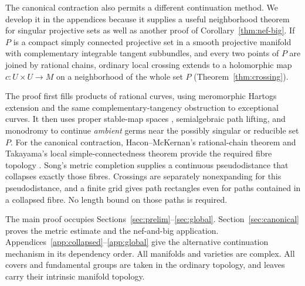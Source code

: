 The canonical contraction also permits a different continuation method.
We develop it in the appendices because it supplies a useful
neighborhood theorem for singular projective sets as well as another
proof of Corollary~\ref{thm:nef-big}. If $P$ is a compact simply connected
projective set in a smooth projective manifold with complementary integrable tangent
subbundles, and every two points of $P$ are joined by rational chains,
ordinary local crossing extends to a holomorphic map $c:U\times U\to M$
on a neighborhood of the whole set $P$
(Theorem~\ref{thm:crossing}).

The proof first fills products of rational curves, using meromorphic
Hartogs extension and the same complementary-tangency obstruction to
exceptional curves. It then uses proper stable-map spaces
\cite{FP97}, semialgebraic path lifting, and monodromy to continue
\emph{ambient} germs near the possibly singular or reducible set $P$.
For the canonical contraction, Hacon--McKernan's rational-chain theorem
and Takayama's local simple-connectedness theorem provide the required
fibre topology \cite{HM07,Takayama03}. Song's metric completion supplies
a continuous pseudodistance that collapses exactly those fibres.
Crossings are separately nonexpanding for this pseudodistance, and a
finite grid gives path rectangles even for paths contained in a
collapsed fibre. No length bound on those paths is required.

The main proof occupies Sections~\ref{sec:prelim}--\ref{sec:global}.
Section~\ref{sec:canonical} proves the metric estimate and the
nef-and-big application. Appendices~\ref{app:collapsed}--\ref{app:global}
give the alternative continuation mechanism in its dependency order.
All manifolds and varieties are complex. All covers and fundamental
groups are taken in the ordinary topology, and leaves carry their
intrinsic manifold topology.
